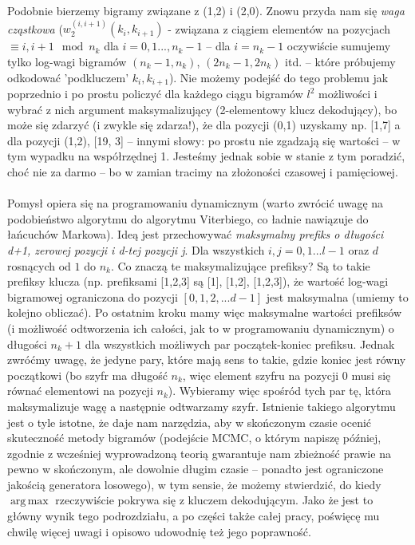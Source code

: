 \documentclass[a4paper]{article}
\DeclareMathOperator*{\argmax}{arg\,max}
\begin{document}
Podobnie bierzemy bigramy związane z (1,2) i (2,0). Znowu przyda nam się \textit{waga cząstkowa} ($w_2^{(i, i+1)}(k_i, k_{i+1})$ - związana z ciągiem elementów na pozycjach $\equiv i, i+1 \mod n_k$ dla $i=0,1...,n_k-1$ – dla $i=n_k-1$ oczywiście sumujemy tylko log-wagi bigramów $(n_k-1, n_k)$, $(2n_k-1, 2n_k)$ itd. – które próbujemy odkodować 'podkluczem' $k_i, k_{i+1}$). Nie możemy podejść do tego problemu jak poprzednio i po prostu policzyć dla każdego ciągu bigramów $l^2$ możliwości i wybrać z nich argument maksymalizujący (2-elementowy klucz dekodujący), bo może się zdarzyć (i zwykle się zdarza!), że dla pozycji (0,1) uzyskamy np. [1,7] a dla pozycji (1,2), [19, 3] – innymi słowy: po prostu nie zgadzają się wartości – w tym wypadku na współrzędnej 1. Jesteśmy jednak sobie w stanie z tym poradzić, choć nie za darmo – bo w zamian tracimy na złożoności czasowej i pamięciowej. \\\\
Pomysł opiera się na programowaniu dynamicznym (warto zwrócić uwagę na podobieństwo algorytmu do algorytmu Viterbiego, co ładnie nawiązuje do łańcuchów Markowa). Ideą jest przechowywać \textit{maksymalny prefiks o długości d+1, zerowej pozycji i d-tej pozycji j}. Dla wszystkich $i,j=0,1...l-1$ oraz $d$ rosnących od $1$ do $n_k$. Co znaczą te maksymalizujące prefiksy? Są to takie prefiksy klucza (np. prefiksami [1,2,3] są [1], [1,2], [1,2,3]), że wartość log-wagi bigramowej ograniczona do pozycji $[0,1,2,...d-1]$ jest maksymalna (umiemy to kolejno obliczać). Po ostatnim kroku mamy więc maksymalne wartości prefiksów (i możliwość odtworzenia ich całości, jak to w programowaniu dynamicznym) o długości $n_k+1$ dla wszystkich możliwych par początek-koniec prefiksu. Jednak zwróćmy uwagę, że jedyne pary, które mają sens to takie, gdzie koniec jest równy początkowi (bo szyfr ma długość $n_k$, więc element szyfru na pozycji $0$ musi się równać elementowi na pozycji $n_k$). Wybieramy więc spośród tych par tę, która maksymalizuje wagę a następnie odtwarzamy szyfr. Istnienie takiego algorytmu jest o tyle istotne, że daje nam narzędzia, aby w skończonym czasie ocenić skuteczność metody bigramów (podejście MCMC, o którym napiszę później, zgodnie z wcześniej wyprowadzoną teorią gwarantuje nam zbieżność prawie na pewno w skończonym, ale dowolnie długim czasie – ponadto jest ograniczone jakością generatora losowego), w tym sensie, że możemy stwierdzić, do kiedy $\argmax$ rzeczywiście pokrywa się z kluczem dekodującym. Jako że jest to główny wynik tego podrozdziału, a po części także całej pracy, poświęcę mu chwilę więcej uwagi i opisowo udowodnię też jego poprawność.\\
\end{document}
